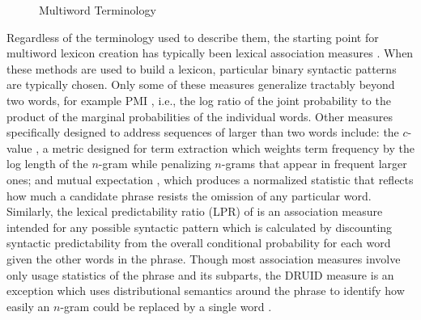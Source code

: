 \documentclass[11pt,letterpaper]{article}
\begin{document}
\begin{figure}[!t]
\caption{Multiword Terminology}
\label{fig:terminology}
\end{figure}



Regardless of the terminology used to describe them, the starting point for multiword lexicon creation has typically been lexical association measures \cite{Church90,Dunning93,Schone01,Evert04,Pecina10,DeAraujo11,Kulkarni11,Ramisch14}. When these methods are used to build a lexicon, particular binary syntactic patterns are typically chosen. Only some of these measures generalize tractably beyond two words, for example PMI \cite{Church90}, i.e., the log ratio of the joint probability to the product of the marginal probabilities of the individual words. Other measures specifically designed to address sequences of larger than two words include: the $c$-value \cite{Frantzi00}, a metric designed for term extraction which weights term frequency by the log length of the $n$-gram while penalizing $n$-grams that appear in frequent larger ones; and mutual expectation \cite{Dias99}, which produces a normalized statistic that reflects how much a candidate phrase resists the omission of any particular word. Similarly, the lexical predictability ratio (LPR) of  is an association measure intended for any possible syntactic pattern which is calculated by discounting syntactic predictability from the overall conditional probability for each word given the other words in the phrase. Though most association measures involve only usage statistics of the phrase and its subparts, the DRUID measure is an exception which uses distributional semantics around the phrase to identify how easily an $n$-gram could be replaced by a single word \cite{Riedl15}.
\end{document}
